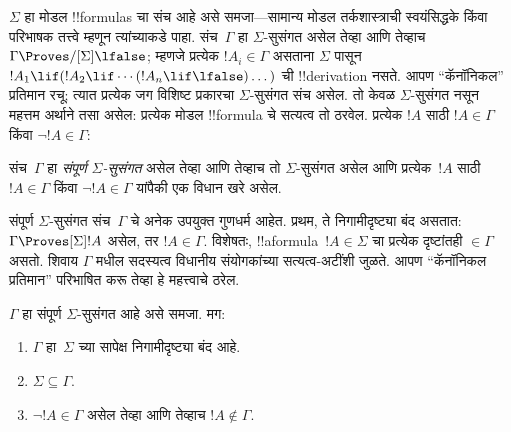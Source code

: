 \documentclass[../../../include/open-logic-section]{subfiles}
\begin{document}


$\Sigma$ हा मोडल !!{formula}s चा संच आहे असे
समजा---सामान्य मोडल तर्कशास्त्राची स्वयंसिद्धके
किंवा परिभाषक तत्त्वे म्हणून त्यांच्याकडे पाहा.
संच~$\Gamma$ हा $\Sigma$-सुसंगत असेल तेव्हा
आणि तेव्हाच $\Gamma \Proves/[\Sigma] \lfalse$;
म्हणजे प्रत्येक $!A_i \in \Gamma$ असताना
$\Sigma$ पासून~$!A_1 \lif (!A_2 \lif \cdots (!A_n \lif
\lfalse)\dots)$ ची !!{derivation} नसते.
आपण ``कॅनॉनिकल'' प्रतिमान रचू; त्यात प्रत्येक
जग विशिष्ट प्रकारचा $\Sigma$-सुसंगत संच
असेल. तो केवळ $\Sigma$-सुसंगत नसून
महत्तम अर्थाने तसा असेल: प्रत्येक मोडल
!!{formula} चे सत्यत्व तो ठरवेल.
प्रत्येक $!A$ साठी $!A
\in \Gamma$ किंवा $\lnot !A \in \Gamma$:

\begin{defn}
  संच~$\Gamma$ हा \emph{संपूर्ण $\Sigma$-सुसंगत}
  असेल तेव्हा आणि तेव्हाच तो $\Sigma$-सुसंगत
  असेल आणि प्रत्येक~$!A$ साठी
  $!A \in \Gamma$ किंवा $\lnot !A \in \Gamma$
  यांपैकी एक विधान खरे असेल.
\end{defn}

संपूर्ण $\Sigma$-सुसंगत संच~$\Gamma$ चे अनेक
उपयुक्त गुणधर्म आहेत. प्रथम, ते निगामीदृष्ट्या
बंद असतात: $\Gamma
\Proves[\Sigma] !A$ असेल, तर $!A \in \Gamma$.
विशेषतः, !!a{formula}~$!A \in \Sigma$ चा प्रत्येक
दृष्टांतही $\in
\Gamma$ असतो. शिवाय $\Gamma$ मधील सदस्यत्व
विधानीय संयोगकांच्या सत्यत्व-अटींशी जुळते.
आपण ``कॅनॉनिकल प्रतिमान'' परिभाषित करू तेव्हा
हे महत्त्वाचे ठरेल.

\begin{prop}
  $\Gamma$ हा संपूर्ण $\Sigma$-सुसंगत आहे असे
  समजा. मग:
  \begin{enumerate}
  \item {}%
    $\Gamma$ हा~$\Sigma$ च्या सापेक्ष
    निगामीदृष्ट्या बंद आहे.
  \item {}%
    $\Sigma \subseteq \Gamma$.
  \item {}%
    $\lnot!A \in \Gamma$ असेल तेव्हा आणि
    तेव्हाच $!A \notin
    \Gamma$.
  \end{enumerate}
\end{prop}
\end{document}
